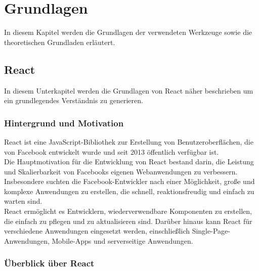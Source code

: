 


\chapter{Grundlagen}
In diesem Kapitel werden die Grundlagen der verwendeten Werkzeuge sowie die theoretischen Grundladen erläutert.
\section{React}
In diesem Unterkapitel werden die Grundlagen von React näher beschrieben um ein grundlegendes Verständnis zu generieren.

\subsection{Hintergrund und Motivation}
React ist eine JavaScript-Bibliothek zur Erstellung von Benutzeroberflächen, die von Facebook entwickelt wurde und seit 2013 öffentlich verfügbar ist.\cite{ReactGettingStarted} \\Die Hauptmotivation für die Entwicklung von React bestand darin, die Leistung und Skalierbarkeit von Facebooks eigenen Webanwendungen zu verbessern. Insbesondere suchten die Facebook-Entwickler nach einer Möglichkeit, große und komplexe Anwendungen zu erstellen, die schnell, reaktionsfreudig und einfach zu warten sind.\\
React ermöglicht es Entwicklern, wiederverwendbare Komponenten zu erstellen, die einfach zu pflegen und zu aktualisieren sind. Darüber hinaus kann React für verschiedene Anwendungen eingesetzt werden, einschließlich Single-Page-Anwendungen, Mobile-Apps und serverseitige Anwendungen.

\subsection{Überblick über React}

